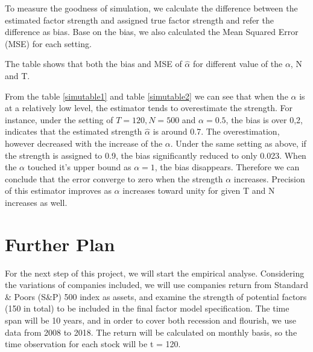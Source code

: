 \documentclass[12pt]{article}
\begin{document}
To measure the goodness of simulation, we calculate the difference between the estimated factor strength and assigned true factor strength and refer the difference as bias.
Base on the bias, we also calculated the Mean Squared Error (MSE) for each setting.

The table shows that both the bias and MSE of $\hat{\alpha}$ for different value of the $\alpha$, N and T.

From the table \ref{simutable1} and table \ref{simutable2} we can see that when the $\alpha$ is at a relatively low level, the estimator  tends to overestimate the strength.
For instance, under the  setting of $T = 120, N = 500$ and $\alpha = 0.5$, the bias is over 0,2, indicates that the estimated strength $\hat{\alpha}$ is around 0.7.
The overestimation, however decreased with the increase of the $\alpha$.
Under the same setting as above, if the strength is assigned to 0.9, the bias significantly reduced to only 0.023.
When the $\alpha$ touched it's upper bound as $\alpha = 1$, the bias disappears.
Therefore we can conclude that the error converge to zero when the strength $\alpha$ increases. 
Precision of this estimator improves as $\alpha$ increases toward unity for given T and N increases as well.

			\section{Further Plan}
For the next step of this project, we will start the empirical analyse. 
Considering the variations of companies included, we will use companies return from Standard \& Poors (S\&P) 500 index as assets, and examine the strength of potential factors (150 in total) to be included in the final factor model specification. 
The time span will be 10 years, and in order to cover both recession and flourish, we use data from 2008  to 2018.
The return will be calculated on monthly basis, so the time observation for each stock will be t = 120. 



\newpage



\newpage
\appendix


\end{document}
